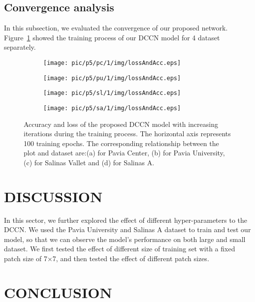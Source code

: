 \documentclass{article}
\begin{document}
	\subsection{Convergence analysis}\label{subsec:convergence}
	In this subsection, we evaluated the convergence of our proposed network.
	Figure~\ref{accandloss} showed the training process of our DCCN model for 4 dataset separately.
	\begin{figure}[htb]
		\begin{subfigure}{0.24\textwidth}
			\texttt{[image: pic/p5/pc/1/img/lossAndAcc.eps]}
			\caption{}
		\end{subfigure}
		\begin{subfigure}{0.24\textwidth}
			\texttt{[image: pic/p5/pu/1/img/lossAndAcc.eps]}
			\caption{}
		\end{subfigure}
		\begin{subfigure}{0.24\textwidth}
			\texttt{[image: pic/p5/sl/1/img/lossAndAcc.eps]}
			\caption{}
		\end{subfigure}
		\begin{subfigure}{0.24\textwidth}
			\texttt{[image: pic/p5/sa/1/img/lossAndAcc.eps]}
			\caption{}
		\end{subfigure}
		\caption{Accuracy and loss of the proposed DCCN model with increasing iterations during the training process.
		The horizontal axis represents 100 training epochs.
		The corresponding relationship between the plot and dataset are:(a) for Pavia Center, (b) for Pavia University,
			(c) for Salinas Vallet and (d) for Salinas A.}
		\label{accandloss}
	\end{figure}


	\section{DISCUSSION}\label{sec:discussion}
	In this sector, we further explored the effect of different hyper-parameters to the DCCN\@.
	We used the Pavia University and Salinas A dataset to train and test our model, so that we can observe the model's
	performance on both large and small dataset.
	We first tested the effect of different size of training set with a fixed patch size of 7×7, and then tested the
	effect of different patch sizes.


	\section{CONCLUSION}\label{sec:conclusion}


	
\end{document}
